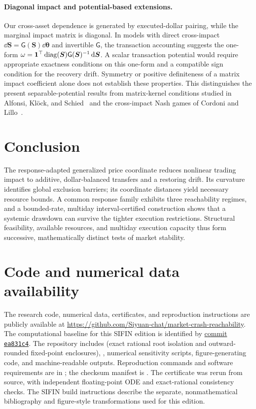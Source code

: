 \documentclass[review,hidelinks,onefignum,onetabnum]{siamonline250211}
\begin{document}
\paragraph{Diagonal impact and potential-based extensions.}
Our cross-asset dependence is generated by executed-dollar pairing, while the marginal impact matrix is diagonal. In models with direct cross-impact $\dd\bm S=\mathsf G(\bm S)\dd\bm\theta$ and invertible $\mathsf G$, the transaction accounting suggests the one-form $\omega=\mathbf{1}^\top\operatorname{diag}(\bm S)\mathsf G(\bm S)^{-1}\,\mathrm{d}\bm S$. A scalar transaction potential would require appropriate exactness conditions on this one-form and a compatible sign condition for the recovery drift. Symmetry or positive definiteness of a matrix impact coefficient alone does not establish these properties. This distinguishes the present separable-potential results from matrix-kernel conditions studied in Alfonsi, Kl\"ock, and Schied~\citep{AlfonsiKlockSchied2016} and the cross-impact Nash games of Cordoni and Lillo~\citep{CordoniLillo2024}.

\section{Conclusion}\label{sec:conclusion}
The response-adapted generalized price coordinate reduces nonlinear trading impact to additive, dollar-balanced transfers and a restoring drift. Its curvature identifies global exclusion barriers; its coordinate distances yield necessary resource bounds. A common response family exhibits three reachability regimes, and a bounded-rate, multiday interval-certified construction shows that a systemic drawdown can survive the tighter execution restrictions. Structural feasibility, available resources, and multiday execution capacity thus form successive, mathematically distinct tests of market stability.

\section*{Code and numerical data availability}
The research code, numerical data, certificates, and reproduction instructions are publicly available at \url{https://github.com/Siyuan-chat/market-crash-reachability}. The computational baseline for this SIFIN edition is identified by \href{https://github.com/Siyuan-chat/market-crash-reachability/tree/ea831c44f5b77b7039dd6644f6f0a791bb74d176}{commit \texttt{ea831c4}}. The repository includes  (exact rational root isolation and outward-rounded fixed-point enclosures), , numerical sensitivity scripts, figure-generating code, and machine-readable outputs. Reproduction commands and software requirements are in ; the checksum manifest is . The certificate was rerun from source, with independent floating-point ODE and exact-rational consistency checks. The SIFIN build instructions describe the separate, nonmathematical bibliography and figure-style transformations used for this edition.
\end{document}
